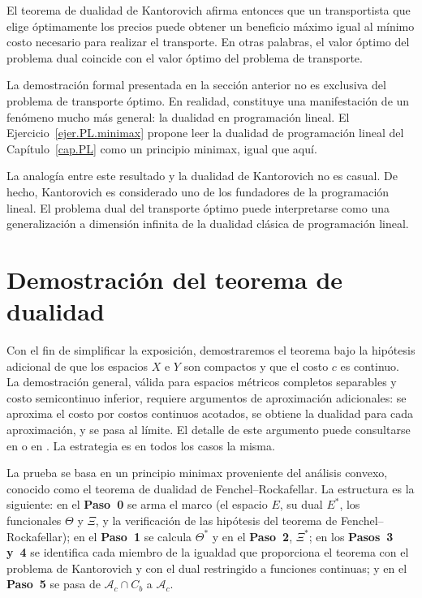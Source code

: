 \documentclass[12pt, a4paper]{amsbook}
\theoremstyle{remark}
\theoremstyle{definition}
\numberwithin{section}{chapter}
\numberwithin{subsection}{section}
\numberwithin{equation}{section}
\numberwithin{figure}{chapter}
\begin{document}
El teorema de dualidad de Kantorovich afirma entonces que un transportista
que elige óptimamente los precios puede obtener un beneficio máximo igual al
mínimo costo necesario para realizar el transporte. En otras palabras, el
valor óptimo del problema dual coincide con el valor óptimo del problema de
transporte.

La demostración formal presentada en la sección anterior no es exclusiva del
problema de transporte óptimo. En realidad, constituye una manifestación de un
fenómeno mucho más general: la dualidad en programación lineal. El
Ejercicio~\ref{ejer.PL.minimax} propone leer la dualidad de programación
lineal del Capítulo~\ref{cap.PL} como un principio minimax, igual que aquí.

La analogía entre este resultado y la dualidad de Kantorovich no es casual.
De hecho, Kantorovich es considerado uno de los fundadores de la programación
lineal. El problema dual del transporte óptimo puede interpretarse como una
generalización a dimensión infinita de la dualidad clásica de programación
lineal.


\section{Demostración del teorema de dualidad}\label{sec.demo.dualidad}

Con el fin de simplificar la exposición, demostraremos el teorema bajo la
hipótesis adicional de que los espacios $X$ e $Y$ son compactos y que el costo
$c$ es continuo. La demostración general, válida para espacios métricos completos
separables y costo semicontinuo inferior, requiere argumentos de aproximación
adicionales: se aproxima el costo por costos continuos acotados, se obtiene la
dualidad para cada aproximación, y se pasa al límite. El detalle de este
argumento puede consultarse en \cite[Theorem~1.3]{Villani2003} o en
\cite[Theorem~1.39]{Santambrogio}. La estrategia es en todos los casos la misma.

La prueba se basa en un principio minimax proveniente del análisis convexo,
conocido como el teorema de dualidad de Fenchel--Rockafellar. La estructura
es la siguiente: en el \textbf{Paso~0} se arma el marco (el espacio $E$, su
dual $E^*$, los funcionales $\Theta$ y $\Xi$, y la verificación de las
hipótesis del teorema de Fenchel--Rockafellar); en el \textbf{Paso~1} se
calcula $\Theta^*$ y en el \textbf{Paso~2}, $\Xi^*$; en los
\textbf{Pasos~3 y~4} se identifica cada miembro de la igualdad que
proporciona el teorema con el problema de Kantorovich y con el dual
restringido a funciones continuas; y en el \textbf{Paso~5} se pasa de
$\mathcal A_c\cap C_b$ a $\mathcal A_c$.
\end{document}
